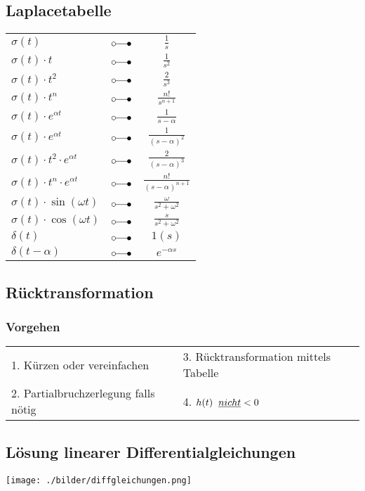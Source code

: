 	\subsection{Laplacetabelle}
	\begin{center}
		\begin{tabular}{|lcc|}
		\hline
			$\sigma \left( t \right)$ & $\laplace$ & $\frac{1}{s}$ \\
			$\sigma \left( t \right) \cdot t$ & $\laplace$ & $\frac{1}{s^2}$\\
			$\sigma \left( t \right) \cdot t^2$ & $\laplace$ & $\frac{2}{s^3}$\\
			$\sigma \left( t \right) \cdot t^n$ & $\laplace$ & $\frac{n!}{s^{n+1}}$\\
			$\sigma \left( t \right) \cdot e^{\alpha t}$ & $\laplace$ &
			$\frac{1}{s-\alpha}$\\
			$\sigma \left( t \right) \cdot e^{\alpha t}$ & $\laplace$ &
			$\frac{1}{( s - \alpha )^2}$\\
			$\sigma \left( t \right)\cdot t^2 \cdot e^{\alpha t}$ &
			$\laplace$ & $\frac{2}{{( s - \alpha )}^3}$\\
			$\sigma \left( t \right)\cdot t^n \cdot e^{ \alpha t}$ &
			$\laplace$ & $\frac{n!}{(s-\alpha)^{n+1}}$\\
			$\sigma \left( t \right) \cdot \sin \left(\omega t \right)$ & $\laplace$ &
			$\frac{\omega}{s^2 + {\omega^2}}$\\
			$\sigma \left( t \right) \cdot \cos \left( \omega t \right)$ & $\laplace$ &
			$\frac{s}{ s^2 + \omega^2}$\\
			$\delta \left( t \right)$ & $\laplace$ & $1\left( s \right)$ \\
			$\delta \left( t - \alpha \right)$ & $\laplace$ & $e^{- \alpha s}$\\
		\hline
		\end{tabular}
	\end{center}
		
	\subsection{Rücktransformation}
		\subsubsection{Vorgehen}
			\begin{tabular}{p{6cm}p{6cm}}
				1. Kürzen oder vereinfachen &
				3. Rücktransformation mittels Tabelle \\
				2. Partialbruchzerlegung falls nötig &
				4. $h(t)\hspace{0.2cm}\underline{nicht} < 0$ \\
			\end{tabular}
	
	\subsection{Lösung linearer Differentialgleichungen}
				\texttt{[image: ./bilder/diffgleichungen.png]}
				